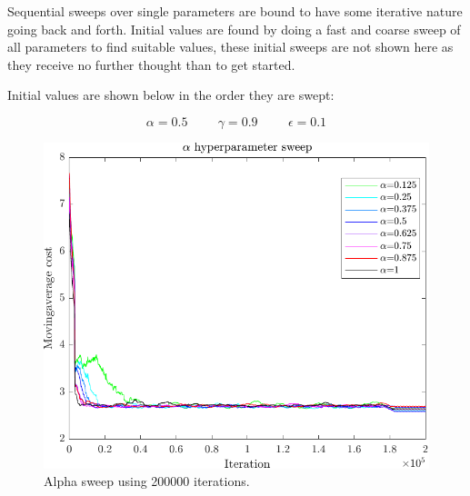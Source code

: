 Sequential sweeps over single parameters are bound to have some iterative nature going back and forth. Initial values are found by doing a fast and coarse sweep of all parameters to find suitable values, these initial sweeps are not shown here as they receive no further thought than to get started.

Initial values are shown below in the order they are swept:

\begin{equation*}
	\alpha = 0.5 \hspace{1cm} \gamma = 0.9 \hspace{1cm} \epsilon = 0.1
\end{equation*}

\begin{figure}[h!]
	\centering
	\includegraphics[width=0.7\linewidth]{figures/AlphaSweepTabRealHFull.pdf}
	\caption{Alpha sweep using 200000 iterations.}
	\label{fig:AlphaSweepTabularFull}
\end{figure} 

